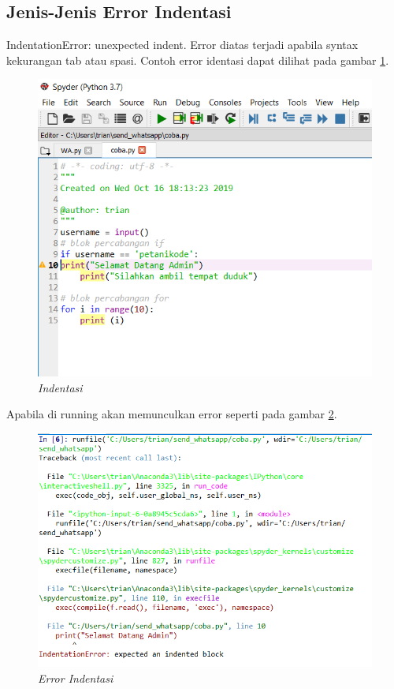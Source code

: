 \subsection{Jenis-Jenis Error Indentasi}
IndentationError: unexpected indent. Error diatas terjadi apabila syntax kekurangan tab atau spasi. Contoh error identasi dapat dilihat pada gambar \ref{Indentasi}.
\begin{figure}[!htbp]
    \centering
    \includegraphics[scale=0.6]{figures/indentasi}
    \caption{\textit{Indentasi}}
    \label{Indentasi}
\end{figure}
Apabila di running akan memunculkan error seperti pada gambar \ref{Error Indentasi}.
\begin{figure}[!htbp]
    \centering
    \includegraphics[scale=0.6]{figures/errorindentasi}
    \caption{\textit{Error Indentasi}}
    \label{Error Indentasi}
\end{figure}

